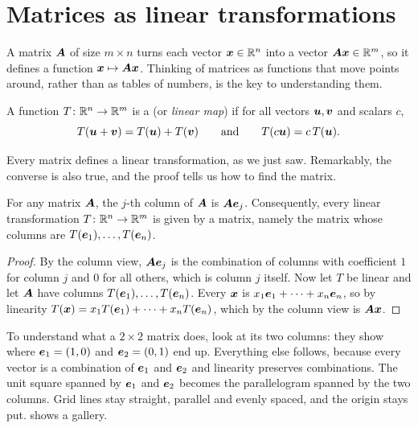 \section{Matrices as linear transformations}\label{sec:linear-transformations}

A matrix $\bm{A}$ of size $m\times n$ turns each vector $\bm{x}\in\mathbb{R}^n$ into a vector
$\bm{A}\bm{x} \in \mathbb{R}^m$, so it defines a function $\bm{x} \mapsto \bm{A}\bm{x}$. Thinking of
matrices as functions that move points around, rather than as tables of
numbers, is the key to understanding them.

\begin{definition}\label{def:linear-transformation}
A function $T\colon \mathbb{R}^n \to \mathbb{R}^m$ is a  (or
\emph{linear map}) if for all vectors $\bm{u}, \bm{v}$ and scalars $c$,
\[
  T(\bm{u} + \bm{v}) = T(\bm{u}) + T(\bm{v}) \qquad\text{and}\qquad T(c\bm{u}) = c\,T(\bm{u}).
\]
\end{definition}

Every matrix defines a linear transformation, as we just saw. Remarkably, the
converse is also true, and the proof tells us how to find the matrix.

\begin{theorem}
\label{thm:columns-images}
For any matrix $\bm{A}$, the $j$-th column of $\bm{A}$ is $\bm{A}\bm{e}_j$. Consequently,
every linear transformation $T\colon\mathbb{R}^n\to\mathbb{R}^m$ is given by a matrix, namely
the matrix whose columns are $T(\bm{e}_1), \dots, T(\bm{e}_n)$.
\end{theorem}

\begin{proof}
By the column view, $\bm{A}\bm{e}_j$ is the combination of columns with coefficient
$1$ for column $j$ and $0$ for all others, which is column $j$ itself. Now let
$T$ be linear and let $\bm{A}$ have columns $T(\bm{e}_1), \dots, T(\bm{e}_n)$. Every
$\bm{x}$ is $x_1\bm{e}_1 + \dots + x_n\bm{e}_n$, so by linearity
$T(\bm{x}) = x_1T(\bm{e}_1) + \dots + x_nT(\bm{e}_n)$, which by the column view is
$\bm{A}\bm{x}$.
\end{proof}

\begin{intuition}
To understand what a $2\times2$ matrix does, look at its two columns: they show
where $\bm{e}_1 = (1, 0)$ and $\bm{e}_2 = (0, 1)$ end up. Everything else follows,
because every vector is a combination of $\bm{e}_1$ and $\bm{e}_2$ and linearity
preserves combinations. The unit square spanned by $\bm{e}_1$ and $\bm{e}_2$ becomes
the parallelogram spanned by the two columns. Grid lines stay straight,
parallel and evenly spaced, and the origin stays put. 
shows a gallery.
\end{intuition}

